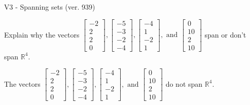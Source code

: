 \begin{exercise}
  \begin{exerciseTitle}V3 - Spanning sets (ver. 939)\end{exerciseTitle}
  \begin{exerciseStatement}
    Explain why the vectors \(\left[\begin{array}{r}
-2 \\
2 \\
2 \\
0
\end{array}\right] , \left[\begin{array}{r}
-5 \\
-3 \\
-2 \\
-4
\end{array}\right] , \left[\begin{array}{r}
-4 \\
1 \\
-2 \\
1
\end{array}\right] , \text{ and } \left[\begin{array}{r}
0 \\
10 \\
2 \\
10
\end{array}\right]\) span or don't span \(\mathbb{R}^4\). 
	


  \end{exerciseStatement}
  \begin{exerciseAnswer}
   The vectors \(\left[\begin{array}{r}
-2 \\
2 \\
2 \\
0
\end{array}\right] , \left[\begin{array}{r}
-5 \\
-3 \\
-2 \\
-4
\end{array}\right] , \left[\begin{array}{r}
-4 \\
1 \\
-2 \\
1
\end{array}\right] , \text{ and } \left[\begin{array}{r}
0 \\
10 \\
2 \\
10
\end{array}\right]\) 
  	 do not  
	span \(\mathbb{R}^4\).
  


  \end{exerciseAnswer}
\end{exercise}